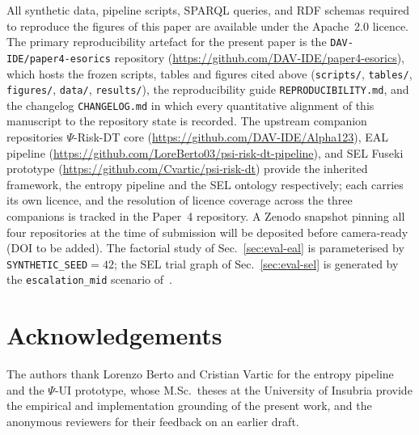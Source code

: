\documentclass[runningheads]{llncs}
\newcommand{\psiop}{\ensuremath{\Psi}}
\begin{document}
All synthetic data, pipeline scripts, SPARQL queries, and RDF schemas
required to reproduce the figures of this paper are available under
the Apache~2.0 licence. The primary reproducibility artefact for the
present paper is the \texttt{DAV-IDE/paper4-esorics} repository
(\url{https://github.com/DAV-IDE/paper4-esorics}), which hosts the
frozen scripts, tables and figures cited above (\texttt{scripts/},
\texttt{tables/}, \texttt{figures/}, \texttt{data/}, \texttt{results/}),
the reproducibility guide \texttt{REPRODUCIBILITY.md}, and the
changelog \texttt{CHANGELOG.md} in which every quantitative alignment
of this manuscript to the repository state is recorded. The upstream
companion repositories
$\psiop$-Risk-DT core (\url{https://github.com/DAV-IDE/Alpha123}),
EAL pipeline (\url{https://github.com/LoreBerto03/psi-risk-dt-pipeline}),
and SEL Fuseki prototype (\url{https://github.com/Cvartic/psi-risk-dt})
provide the inherited framework, the entropy pipeline and the SEL
ontology respectively; each carries its own licence, and the resolution
of licence coverage across the three companions is tracked in the
Paper~4 repository. A Zenodo snapshot pinning all four repositories at
the time of submission will be deposited before camera-ready (DOI to be
added). The factorial study of Sec.~\ref{sec:eval-eal} is parameterised
by \texttt{SYNTHETIC\_SEED}$=42$; the SEL trial graph of
Sec.~\ref{sec:eval-sel} is generated by the
\texttt{escalation\_mid} scenario of~\cite{vartic2026}.

\section*{Acknowledgements}

The authors thank Lorenzo Berto and Cristian Vartic for the entropy
pipeline and the $\psiop$-UI prototype, whose M.Sc.\ theses at the
University of Insubria provide the empirical and implementation
grounding of the present work, and the anonymous reviewers for their
feedback on an earlier draft.
\end{document}
